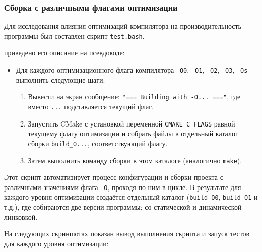 \subsubsection{Сборка с различными флагами оптимизации}

Для исследования влияния оптимизаций компилятора на производительность программы был составлен скрипт \texttt{test.bash}.

\vspace{.3cm}

 приведено его описание на псевдокоде:
\begin{itemize}
\item Для каждого оптимизационного флага компилятора \texttt{-O0}, \texttt{-O1}, \texttt{-O2}, \texttt{-O3}, \texttt{-Os} выполнить следующие шаги:
\begin{enumerate}
\item Вывести на экран сообщение: \texttt{"=== Building with -O... ==="}, где вместо \texttt{...} подставляется текущий флаг.
\item Запустить CMake с установкой переменной \texttt{CMAKE\_C\_FLAGS} равной текущему флагу оптимизации и собрать файлы в отдельный каталог сборки \texttt{build\_O...}, соответствующий флагу.
\item Затем выполнить команду сборки в этом каталоге (аналогично \texttt{make}).
\end{enumerate}
\end{itemize}

\noindent Этот скрипт автоматизирует процесс конфигурации и сборки проекта с различными значениями флага \texttt{-O}, проходя по ним в цикле. В результате для каждого уровня оптимизации создаётся отдельный каталог (\texttt{build\_O0}, \texttt{build\_O1} и т.д.), где собираются две версии программы: со статической и динамической линковкой.

На следующих скриншотах показан вывод выполнения скрипта и запуск тестов для каждого уровня оптимизации:





